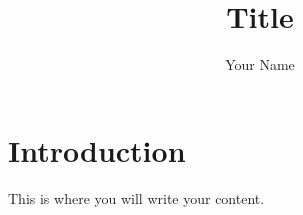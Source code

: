 \documentclass{article}
\title{Title}
\author{Your Name}
\begin{document}
  
\maketitle{}
\section{Introduction}
This is where you will write your content. 
\end{document}
